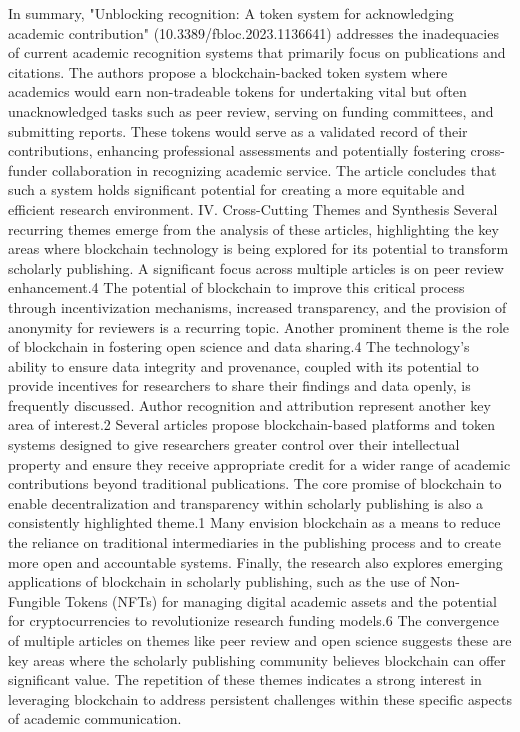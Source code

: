 \documentclass{article}
\begin{document}
In summary, "Unblocking recognition: A token system for acknowledging academic contribution" (10.3389/fbloc.2023.1136641) addresses the inadequacies of current academic recognition systems that primarily focus on publications and citations. The authors propose a blockchain-backed token system where academics would earn non-tradeable tokens for undertaking vital but often unacknowledged tasks such as peer review, serving on funding committees, and submitting reports. These tokens would serve as a validated record of their contributions, enhancing professional assessments and potentially fostering cross-funder collaboration in recognizing academic service. The article concludes that such a system holds significant potential for creating a more equitable and efficient research environment.
IV. Cross-Cutting Themes and Synthesis
Several recurring themes emerge from the analysis of these articles, highlighting the key areas where blockchain technology is being explored for its potential to transform scholarly publishing. A significant focus across multiple articles is on peer review enhancement.4 The potential of blockchain to improve this critical process through incentivization mechanisms, increased transparency, and the provision of anonymity for reviewers is a recurring topic. Another prominent theme is the role of blockchain in fostering open science and data sharing.4 The technology's ability to ensure data integrity and provenance, coupled with its potential to provide incentives for researchers to share their findings and data openly, is frequently discussed. Author recognition and attribution represent another key area of interest.2 Several articles propose blockchain-based platforms and token systems designed to give researchers greater control over their intellectual property and ensure they receive appropriate credit for a wider range of academic contributions beyond traditional publications. The core promise of blockchain to enable decentralization and transparency within scholarly publishing is also a consistently highlighted theme.1 Many envision blockchain as a means to reduce the reliance on traditional intermediaries in the publishing process and to create more open and accountable systems. Finally, the research also explores emerging applications of blockchain in scholarly publishing, such as the use of Non-Fungible Tokens (NFTs) for managing digital academic assets and the potential for cryptocurrencies to revolutionize research funding models.6 The convergence of multiple articles on themes like peer review and open science suggests these are key areas where the scholarly publishing community believes blockchain can offer significant value. The repetition of these themes indicates a strong interest in leveraging blockchain to address persistent challenges within these specific aspects of academic communication.
\end{document}
